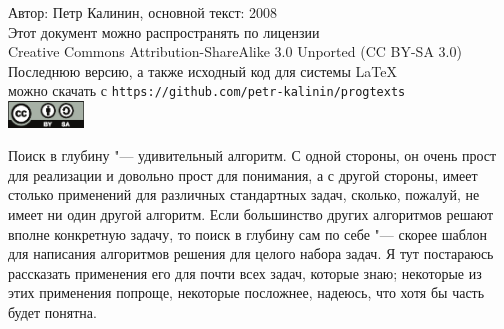\documentclass[a4paper,10pt]{problems}
\begin{document}

\begin{flushright}
Автор: Петр Калинин, основной текст: 2008\\
Этот документ можно распространять по лицензии\\
Creative Commons Attribution-ShareAlike 3.0 Unported (CC BY-SA 3.0)\\
Последнюю версию, а также исходный код для системы \LaTeX\\
можно скачать с \verb`https://github.com/petr-kalinin/progtexts`\\
\includegraphics[width=2cm]{by-sa-corr.eps}
\end{flushright}

Поиск в глубину "--- удивительный алгоритм. С одной стороны, он очень прост для реализации и 
довольно прост для понимания, а с другой стороны, имеет столько применений для различных 
стандартных задач, сколько, пожалуй, не имеет ни один другой алгоритм. Если большинство других 
алгоритмов решают вполне конкретную задачу, то поиск в глубину сам по себе "--- скорее шаблон для 
написания алгоритмов решения для целого набора задач. Я тут постараюсь рассказать применения его 
для почти всех задач, которые знаю; некоторые из этих применения попроще, некоторые посложнее, 
надеюсь, что хотя бы часть будет понятна.

%







\end{document}
